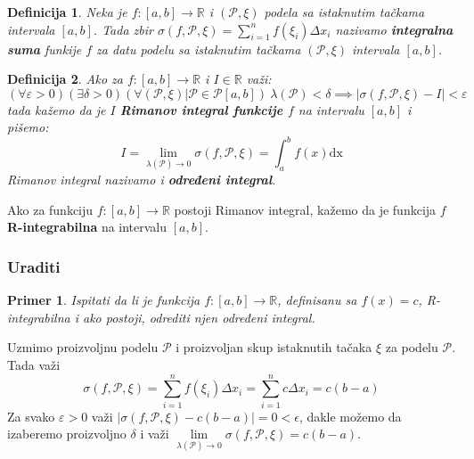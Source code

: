\documentclass{article}
\newtheorem{definicija}{Definicija}[section]
\newtheorem{prim}{Primer}[section]
\begin{document}
\begin{defbox}
    \label{definicija_2.2}
    \begin{definicija}
        Neka je $f:\left[a,b\right]\longrightarrow\mathbb{R}$ i $\left(\mathcal{P},\xi\right)$ podela sa istaknutim tačkama intervala $\left[a,b\right]$. Tada zbir
        $\displaystyle\sigma\left(f,\mathcal{P},\xi\right)=\sum_{i=1}^{n}f\left(\xi_i\right)\varDelta x_i$ nazivamo \textbf{integralna suma} funkije $f$ za datu podelu
        sa istaknutim tačkama $\left(\mathcal{P},\xi\right)$ intervala $\left[a,b\right]$.
    \end{definicija}
\end{defbox}

\begin{defbox}
    \label{definicija_2.3}
    \begin{definicija}
        Ako za $f: \left[a,b\right]\longrightarrow\mathbb{R}$ i $I\in\mathbb{R}$ važi:
        $$\left(\forall\varepsilon>0\right)\left(\exists\delta>0\right)\left(\forall\left(\mathcal{P},\xi\right)\big|\mathcal{P}\in\mathcal{P}\left[a,b\right]\right)\ \lambda\left(\mathcal{P}\right)<\delta\implies|\sigma\left(f,\mathcal{P},\xi\right)-I|<\varepsilon$$
        tada kažemo da je $I$ \textbf{Rimanov integral funkcije $f$} na intervalu $\left[a,b\right]$ i pišemo:
        $$I=\lim\limits_{\lambda\left(\mathcal{P}\right)\rightarrow 0}\sigma\left(f,\mathcal{P},\xi\right)=\int_{a}^{b}f\left(x\right)\text{dx}$$
        Rimanov integral nazivamo i \textbf{određeni integral}.
    \end{definicija}
\end{defbox}

Ako za funkciju $f:\left[a,b\right]\longrightarrow\mathbb{R}$ postoji Rimanov integral, kažemo da je funkcija $f$ \textbf{R-integrabilna} na intervalu $\left[a,b\right]$.

\subsubsection{Uraditi}

\begin{primbox}
    \label{primer_2.1}
    \begin{prim}
        Ispitati da li je funkcija $f: \left[a,b\right]\longrightarrow\mathbb{R}$, definisanu sa $f\left(x\right)=c$, R-integrabilna i ako postoji, odrediti njen određeni integral.
    \end{prim}
    Uzmimo proizvoljnu podelu $\mathcal{P}$ i proizvoljan skup istaknutih tačaka $\xi$ za podelu $\mathcal{P}$. Tada važi
    \begin{equation}
        \label{primer_2.1:eq1}
        \sigma\left(f,\mathcal{P},\xi\right)=\sum_{i=1}^{n} f\left(\xi_i\right)\Delta x_i=\sum_{i=1}^{n} c\Delta x_i=c\left(b-a\right)
    \end{equation}
    Za svako $\varepsilon>0$ važi $\left|\sigma\left(f,\mathcal{P},\xi\right)-c(b-a)\right|=0<\epsilon$, dakle možemo da
    izaberemo proizvoljno $\delta$ i važi
    $\lim\limits_{\lambda\left(\mathcal{P}\right)\rightarrow0} \sigma\left(f,\mathcal{P},\xi\right)=c(b-a)$.

\end{primbox}
\end{document}
